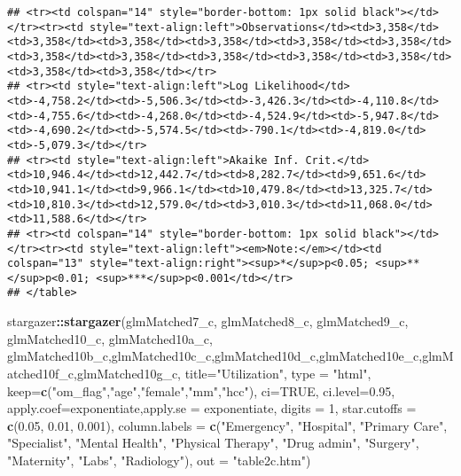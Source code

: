 \documentclass[]{article}
\newenvironment{Shaded}{\begin{snugshade}}{\end{snugshade}}
\newcommand{\KeywordTok}[1]{\textcolor[rgb]{0.13,0.29,0.53}{\textbf{#1}}}
\newcommand{\DataTypeTok}[1]{\textcolor[rgb]{0.13,0.29,0.53}{#1}}
\newcommand{\DecValTok}[1]{\textcolor[rgb]{0.00,0.00,0.81}{#1}}
\newcommand{\FloatTok}[1]{\textcolor[rgb]{0.00,0.00,0.81}{#1}}
\newcommand{\StringTok}[1]{\textcolor[rgb]{0.31,0.60,0.02}{#1}}
\newcommand{\OtherTok}[1]{\textcolor[rgb]{0.56,0.35,0.01}{#1}}
\newcommand{\OperatorTok}[1]{\textcolor[rgb]{0.81,0.36,0.00}{\textbf{#1}}}
\newcommand{\NormalTok}[1]{#1}
\begin{document}
\begin{verbatim}
## <tr><td colspan="14" style="border-bottom: 1px solid black"></td></tr><tr><td style="text-align:left">Observations</td><td>3,358</td><td>3,358</td><td>3,358</td><td>3,358</td><td>3,358</td><td>3,358</td><td>3,358</td><td>3,358</td><td>3,358</td><td>3,358</td><td>3,358</td><td>3,358</td><td>3,358</td></tr>
## <tr><td style="text-align:left">Log Likelihood</td><td>-4,758.2</td><td>-5,506.3</td><td>-3,426.3</td><td>-4,110.8</td><td>-4,755.6</td><td>-4,268.0</td><td>-4,524.9</td><td>-5,947.8</td><td>-4,690.2</td><td>-5,574.5</td><td>-790.1</td><td>-4,819.0</td><td>-5,079.3</td></tr>
## <tr><td style="text-align:left">Akaike Inf. Crit.</td><td>10,946.4</td><td>12,442.7</td><td>8,282.7</td><td>9,651.6</td><td>10,941.1</td><td>9,966.1</td><td>10,479.8</td><td>13,325.7</td><td>10,810.3</td><td>12,579.0</td><td>3,010.3</td><td>11,068.0</td><td>11,588.6</td></tr>
## <tr><td colspan="14" style="border-bottom: 1px solid black"></td></tr><tr><td style="text-align:left"><em>Note:</em></td><td colspan="13" style="text-align:right"><sup>*</sup>p<0.05; <sup>**</sup>p<0.01; <sup>***</sup>p<0.001</td></tr>
## </table>
\end{verbatim}

\begin{Shaded}
\begin{Highlighting}[]
\NormalTok{stargazer}\OperatorTok{::}\KeywordTok{stargazer}\NormalTok{(glmMatched7_c, glmMatched8_c, glmMatched9_c, glmMatched10_c, glmMatched10a_c, glmMatched10b_c,glmMatched10c_c,glmMatched10d_c,glmMatched10e_c,glmMatched10f_c,glmMatched10g_c,}
                     \DataTypeTok{title=}\StringTok{"Utilization"}\NormalTok{, }
                     \DataTypeTok{type =} \StringTok{"html"}\NormalTok{,}
                     \DataTypeTok{keep=}\KeywordTok{c}\NormalTok{(}\StringTok{"om_flag"}\NormalTok{,}\StringTok{"age"}\NormalTok{,}\StringTok{"female"}\NormalTok{,}\StringTok{"mm"}\NormalTok{,}\StringTok{"hcc"}\NormalTok{),}
                     \DataTypeTok{ci=}\OtherTok{TRUE}\NormalTok{, }\DataTypeTok{ci.level=}\FloatTok{0.95}\NormalTok{,}
                     \DataTypeTok{apply.coef=}\NormalTok{exponentiate,}\DataTypeTok{apply.se =}\NormalTok{ exponentiate,}
                     \DataTypeTok{digits =} \DecValTok{1}\NormalTok{, }
                     \DataTypeTok{star.cutoffs =} \KeywordTok{c}\NormalTok{(}\FloatTok{0.05}\NormalTok{, }\FloatTok{0.01}\NormalTok{, }\FloatTok{0.001}\NormalTok{),}
                     \DataTypeTok{column.labels =} \KeywordTok{c}\NormalTok{(}\StringTok{"Emergency"}\NormalTok{, }\StringTok{"Hospital"}\NormalTok{, }\StringTok{"Primary Care"}\NormalTok{, }\StringTok{"Specialist"}\NormalTok{, }\StringTok{"Mental Health"}\NormalTok{, }\StringTok{"Physical Therapy"}\NormalTok{, }\StringTok{"Drug admin"}\NormalTok{, }\StringTok{"Surgery"}\NormalTok{, }\StringTok{"Maternity"}\NormalTok{, }\StringTok{"Labs"}\NormalTok{, }\StringTok{"Radiology"}\NormalTok{),}
                     \DataTypeTok{out =} \StringTok{"table2c.htm"}\NormalTok{)}
\end{Highlighting}
\end{Shaded}
\end{document}
